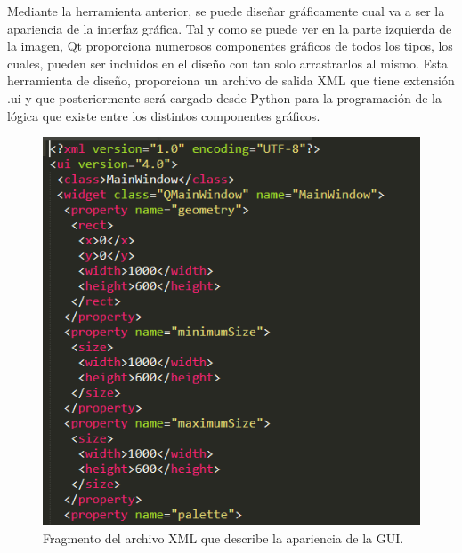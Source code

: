 Mediante la herramienta anterior, se puede diseñar gráficamente cual va a ser la apariencia de la interfaz gráfica. Tal y como se puede ver en la parte izquierda de la imagen, Qt proporciona numerosos componentes gráficos de todos los tipos, los cuales, pueden ser incluidos en el diseño con tan solo arrastrarlos al mismo. Esta herramienta de diseño, proporciona un archivo de salida XML que tiene extensión .ui y que posteriormente será cargado desde Python para la programación de la lógica que existe entre los distintos componentes gráficos.

\begin{figure}[H]
    \centering
    \includegraphics[width=0.55\linewidth]{pictures/XmlGui.PNG}
    \caption{Fragmento del archivo XML que describe la apariencia de la GUI.}
    \label{fig:ui_XML}
\end{figure}

